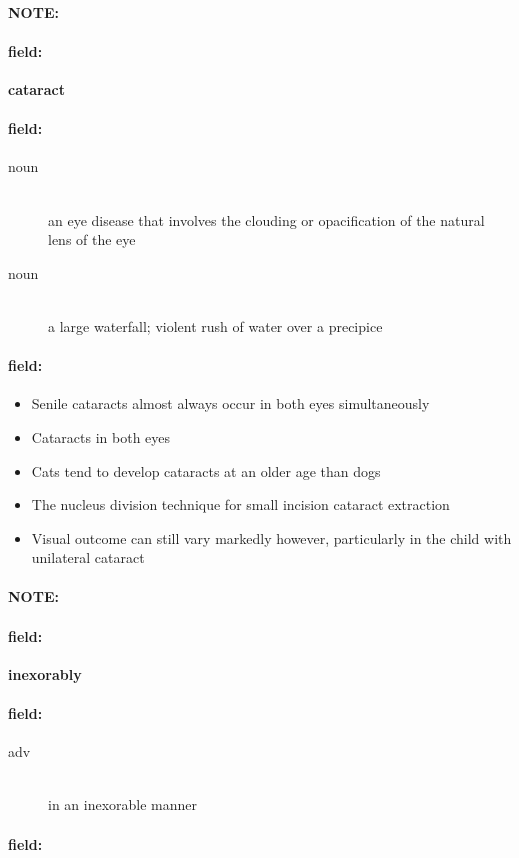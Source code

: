 \documentclass[12pt]{article}
\newenvironment{note}{\paragraph{NOTE:}}{}
\newenvironment{field}{\paragraph{field:}}{}
\begin{document}
\begin{note}
\begin{field}
\textbf{\large cataract}
\end{field}


\begin{field}
\begin{description}
\item[noun] \hfill \\ 
an eye disease that involves the clouding or opacification of the natural lens of the eye

\item[noun] \hfill \\ 
a large waterfall; violent rush of water over a precipice

\end{description}
\end{field}

\begin{field}
\begin{itemize}
\item Senile cataracts almost always occur in both eyes simultaneously
\item Cataracts in both eyes
\item Cats tend to develop cataracts at an older age than dogs
\item The nucleus division technique for small incision cataract extraction
\item Visual outcome can still vary markedly however, particularly in the child with unilateral cataract
\end{itemize}
\end{field}
\end{note}
\begin{note}
\begin{field}
\textbf{\large inexorably}
\end{field}


\begin{field}
\begin{description}
\item[adv] \hfill \\ 
in an inexorable manner

\end{description}
\end{field}

\begin{field}
\end{field}
\end{note}
\end{document}
